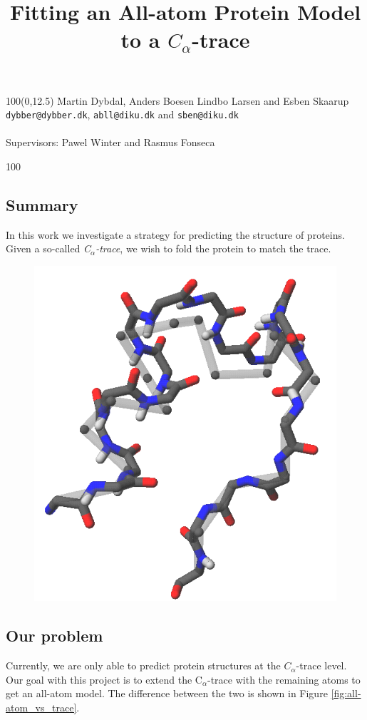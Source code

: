 \documentclass[a0,portrait]{a0poster}
\title{Fitting an All-atom Protein Model to a $C_\alpha$-trace}
\newcommand{\Ca}{C$_{\alpha}${}}
\begin{document}
\Createtitle

\begin{textblock}{100}(0,12.5)
\large
Martin Dybdal, Anders Boesen Lindbo Larsen and Esben Skaarup
\\\vspace{-8mm}\texttt{dybber@dybber.dk}, \texttt{abll@diku.dk} and \texttt{sben@diku.dk}
\\ \\Supervisors: Pawel Winter and Rasmus Fonseca
\end{textblock}

\begin{GridBlock}{0}{21}{100}
\begin{multicols}{3}
\section{Summary}
In this work we investigate a strategy for predicting the structure of
proteins. Given a so-called \emph{\Ca-trace}, we wish to fold the
protein to match the trace.
\begin{figure}
\vspace{1.7cm}
\hspace{-3cm}
\includegraphics[width=.4\columnwidth]{exampleposter-figures/forside.png}
\vspace{-1.5cm}
\end{figure}
\vspace{1.5cm}

\subsection{Our problem}
Currently, we are only able to predict protein structures at the
$C_\alpha$-trace level.  Our goal with this project is to extend the
\Ca-trace with the remaining atoms to get an all-atom model.  The
difference between the two is shown in Figure
\ref{fig:all-atom_vs_trace}.


\end{multicols}
\end{GridBlock}
\end{document}
